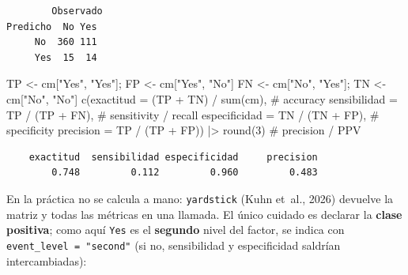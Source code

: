 \documentclass[
  letterpaper,
  DIV=11,
  numbers=noendperiod]{scrartcl}
\newenvironment{Shaded}{\begin{snugshade}}{\end{snugshade}}
\newcommand{\AttributeTok}[1]{\textcolor[rgb]{0.40,0.45,0.13}{#1}}
\newcommand{\CommentTok}[1]{\textcolor[rgb]{0.37,0.37,0.37}{#1}}
\newcommand{\DecValTok}[1]{\textcolor[rgb]{0.68,0.00,0.00}{#1}}
\newcommand{\FunctionTok}[1]{\textcolor[rgb]{0.28,0.35,0.67}{#1}}
\newcommand{\NormalTok}[1]{\textcolor[rgb]{0.00,0.23,0.31}{#1}}
\newcommand{\OtherTok}[1]{\textcolor[rgb]{0.00,0.23,0.31}{#1}}
\newcommand{\SpecialCharTok}[1]{\textcolor[rgb]{0.37,0.37,0.37}{#1}}
\newcommand{\StringTok}[1]{\textcolor[rgb]{0.13,0.47,0.30}{#1}}
\begin{document}
\begin{verbatim}
        Observado
Predicho  No Yes
     No  360 111
     Yes  15  14
\end{verbatim}

\begin{Shaded}
\begin{Highlighting}[]
\NormalTok{TP }\OtherTok{\textless{}{-}}\NormalTok{ cm[}\StringTok{"Yes"}\NormalTok{, }\StringTok{"Yes"}\NormalTok{]; FP }\OtherTok{\textless{}{-}}\NormalTok{ cm[}\StringTok{"Yes"}\NormalTok{, }\StringTok{"No"}\NormalTok{]}
\NormalTok{FN }\OtherTok{\textless{}{-}}\NormalTok{ cm[}\StringTok{"No"}\NormalTok{,  }\StringTok{"Yes"}\NormalTok{]; TN }\OtherTok{\textless{}{-}}\NormalTok{ cm[}\StringTok{"No"}\NormalTok{,  }\StringTok{"No"}\NormalTok{]}
\FunctionTok{c}\NormalTok{(}\AttributeTok{exactitud     =}\NormalTok{ (TP }\SpecialCharTok{+}\NormalTok{ TN) }\SpecialCharTok{/} \FunctionTok{sum}\NormalTok{(cm),   }\CommentTok{\# accuracy}
  \AttributeTok{sensibilidad  =}\NormalTok{ TP }\SpecialCharTok{/}\NormalTok{ (TP }\SpecialCharTok{+}\NormalTok{ FN),        }\CommentTok{\# sensitivity / recall}
  \AttributeTok{especificidad =}\NormalTok{ TN }\SpecialCharTok{/}\NormalTok{ (TN }\SpecialCharTok{+}\NormalTok{ FP),        }\CommentTok{\# specificity}
  \AttributeTok{precision     =}\NormalTok{ TP }\SpecialCharTok{/}\NormalTok{ (TP }\SpecialCharTok{+}\NormalTok{ FP)) }\SpecialCharTok{|\textgreater{}} \FunctionTok{round}\NormalTok{(}\DecValTok{3}\NormalTok{)   }\CommentTok{\# precision / PPV}
\end{Highlighting}
\end{Shaded}

\begin{verbatim}
    exactitud  sensibilidad especificidad     precision 
        0.748         0.112         0.960         0.483 
\end{verbatim}

En la práctica no se calcula a mano: \texttt{yardstick} (Kuhn et~al.,
2026) devuelve la matriz y todas las métricas en una llamada. El único
cuidado es declarar la \textbf{clase positiva}; como aquí \texttt{Yes}
es el \textbf{segundo} nivel del factor, se indica con
\texttt{event\_level\ =\ "second"} (si no, sensibilidad y especificidad
saldrían intercambiadas):

\begin{Shaded}
\end{Shaded}
\end{document}
